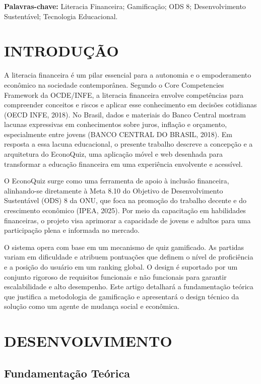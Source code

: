 \documentclass[12pt,a4paper]{article}
\begin{document}
\noindent\textbf{Palavras-chave:} Literacia Financeira; Gamificação; ODS 8; Desenvolvimento Sustentável; Tecnologia Educacional.



\section{INTRODUÇÃO}

A literacia financeira é um pilar essencial para a autonomia e o empoderamento econômico na sociedade contemporânea. Segundo o Core Competencies Framework da OCDE/INFE, a literacia financeira envolve competências para compreender conceitos e riscos e aplicar esse conhecimento em decisões cotidianas (OECD INFE, 2018). No Brasil, dados e materiais do Banco Central mostram lacunas expressivas em conhecimentos sobre juros, inflação e orçamento, especialmente entre jovens (BANCO CENTRAL DO BRASIL, 2018). Em resposta a essa lacuna educacional, o presente trabalho descreve a concepção e a arquitetura do EconoQuiz, uma aplicação móvel e web desenhada para transformar a educação financeira em uma experiência envolvente e acessível.

O EconoQuiz surge como uma ferramenta de apoio à inclusão financeira, alinhando-se diretamente à Meta 8.10 do Objetivo de Desenvolvimento Sustentável (ODS) 8 da ONU, que foca na promoção do trabalho decente e do crescimento econômico (IPEA, 2025). Por meio da capacitação em habilidades financeiras, o projeto visa aprimorar a capacidade de jovens e adultos para uma participação plena e informada no mercado.

O sistema opera com base em um mecanismo de quiz gamificado. As partidas variam em dificuldade e atribuem pontuações que definem o nível de proficiência e a posição do usuário em um ranking global. O design é suportado por um conjunto rigoroso de requisitos funcionais e não funcionais para garantir escalabilidade e alto desempenho. Este artigo detalhará a fundamentação teórica que justifica a metodologia de gamificação e apresentará o design técnico da solução como um agente de mudança social e econômica.

\section{DESENVOLVIMENTO}

\subsection{Fundamentação Teórica}
\end{document}
